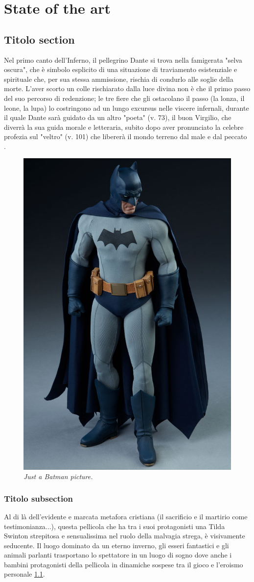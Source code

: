\chapter{State of the art}

\section{Titolo section}
Nel primo canto dell'Inferno, il pellegrino Dante si trova nella famigerata "selva oscura", che è simbolo esplicito di una situazione di traviamento esistenziale e spirituale che, per sua stessa ammissione, rischia di condurlo alle soglie della morte. L'aver scorto un colle rischiarato dalla luce divina non è che il primo passo del suo percorso di redenzione; le tre fiere che gli ostacolano il passo (la lonza, il leone, la lupa) lo costringono ad un lungo excursus nelle viscere infernali, durante il quale Dante sarà guidato da un altro "poeta" (v. 73), il buon Virgilio, che diverrà la sua guida morale e letteraria, subito dopo aver pronunciato la celebre profezia sul "veltro" (v. 101) che libererà il mondo terreno dal male e dal peccato \cite{lindskoog1986first}.

\begin{figure}[]
	\centering
	\includegraphics[width=.25\columnwidth]{images/batman}
	
	\caption{\textit{Just a Batman picture.}}
	\label{img:batman}
\end{figure}

\subsection{Titolo subsection}

Al di là dell'evidente e marcata metafora cristiana (il sacrificio e il martirio come testimonianza...), questa pellicola che ha tra i suoi protagonisti una Tilda Swinton strepitosa e sensualissima nel ruolo della malvagia strega, è visivamente seducente. Il luogo dominato da un eterno inverno, gli esseri fantastici e gli animali parlanti trasportano lo spettatore in un luogo di sogno dove anche i bambini protagonisti della pellicola in dinamiche sospese tra il gioco e l'eroismo personale \ref{img:batman}.


